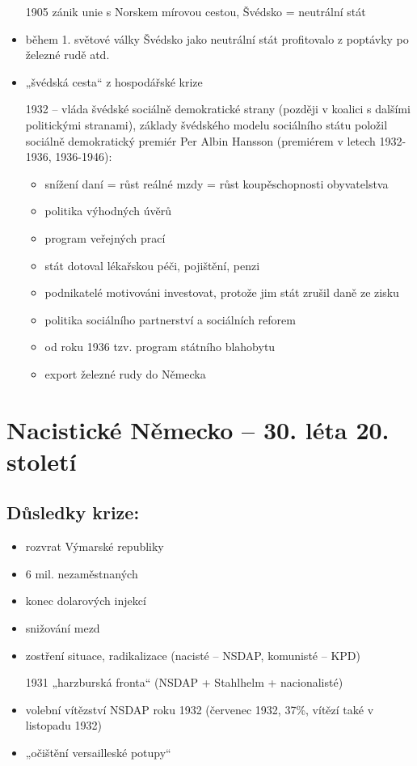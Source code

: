 \documentclass{article}
\begin{document}
\begin{itemize}
    \item[1905] zánik unie s Norskem mírovou cestou, Švédsko = neutrální stát
    \item během 1. světové války Švédsko jako neutrální stát profitovalo z poptávky po železné rudě atd.
    \item „švédská cesta“ z hospodářské krize
    \item [1932] – vláda švédské sociálně demokratické strany (později v koalici s dalšími politickými stranami), základy švédského modelu sociálního státu položil sociálně demokratický premiér Per Albin Hansson (premiérem v letech 1932-1936, 1936-1946):
    \begin{itemize}
        \item snížení daní = růst reálné mzdy = růst koupěschopnosti obyvatelstva
        \item politika výhodných úvěrů
        \item program veřejných prací
        \item stát dotoval lékařskou péči, pojištění, penzi
        \item podnikatelé motivováni investovat, protože jim stát zrušil daně ze zisku
        \item politika sociálního partnerství a sociálních reforem
        \item od roku 1936 tzv. program státního blahobytu
        \item export železné rudy do Německa
    \end{itemize}
\end{itemize}

\section*{Nacistické Německo – 30. léta 20. století}

\subsection*{Důsledky krize:}
\begin{itemize}
    \item rozvrat Výmarské republiky
    \item 6 mil. nezaměstnaných
    \item konec dolarových injekcí
    \item snižování mezd
    \item zostření situace, radikalizace (nacisté – NSDAP, komunisté – KPD)
    \item [1931] „harzburská fronta“ (NSDAP + Stahlhelm + nacionalisté)
    \item volební vítězství NSDAP roku 1932 (červenec 1932, 37\%, vítězí také v listopadu 1932)
    \item „očištění versailleské potupy“
\end{itemize}
\end{document}

